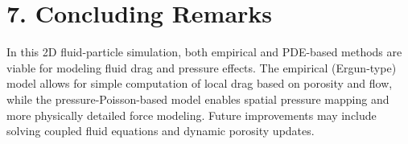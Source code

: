 \documentclass[12pt]{article}
\begin{document}
\section*{7. Concluding Remarks}
In this 2D fluid-particle simulation, both empirical and PDE-based methods are viable for modeling fluid drag and pressure effects. The empirical (Ergun-type) model allows for simple computation of local drag based on porosity and flow, while the pressure-Poisson-based model enables spatial pressure mapping and more physically detailed force modeling. Future improvements may include solving coupled fluid equations and dynamic porosity updates.
\end{document}
